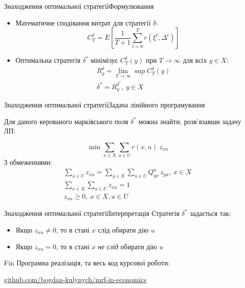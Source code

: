 \documentclass[pdf]{beamer}
\begin{document}
\begin{frame}{Знаходження оптимальної стратегії}{Формулювання}
	\begin{itemize}[<+->]
	\item Математичне сподівання витрат для стратегії \(\delta\):
	\[ C_T^{\delta} = E\left[\frac{1}{T+1}\sum_{t=0}^T r(\xi^t, \Delta^t)\right] \]
	\item Оптимальна стратегія \(\delta^*\) мінімізує \(C_T^{\delta}(y)\) при \(T\rightarrow\infty\) для всіх \(y \in X\):
	\begin{gather*}
	R_y^\delta = \lim\limits_{T \rightarrow \infty} \sup C_T^{\delta}(y) \\
	\delta^* = R_y^{\delta^*},\ y \in X
	\end{gather*}
	\end{itemize}
\end{frame}


\begin{frame}{Знаходження оптимальної стратегії}{Задача лінійного програмування}

Для даного керованого марківського поля \(\delta^*\) можна знайти, розв’язавши задачу ЛП:

\[\min \sum_{x \in X} \sum_{u \in U} r(x, u)\ z_{xu}\]
З обмеженнями:
\begin{gather*}
\sum_{u \in U} z_{xu} = \sum_{y \in X} \sum_{u \in U} Q_{yx}^u\,z_{yu},\ x \in X \\
\sum_{x \in X} \sum_{u \in U} z_{xu} = 1 \\
z_{xu} \geq 0,\ x \in X, u \in U
\end{gather*}

\end{frame}


\begin{frame}{Знаходження оптимальної стратегії}{Інтерпретація}
Стратегія \(\delta^*\) задається так:

\begin{itemize}
	\item Якщо \(z_{xu} \neq 0\), то в стані \(x\) слід обирати дію \(u\)
	\item Якщо \(z_{xu} = 0\), то в стані \(x\) \textit{не слід} обирати дію \(u\)
\end{itemize}
\end{frame}

\begin{frame}{Fin}
Програмна реалізація, та весь код курсової роботи:

\begin{center}
	\url{github.com/bogdan-kulynych/mrf-in-economics}
\end{center}

\end{frame}
\end{document}
